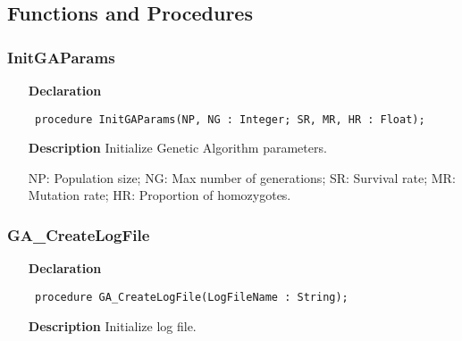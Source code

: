 \documentclass[12pt,a4paper,oneside]{report}
\newcommand{\declarationitem}[1]{\textbf{#1}}
\newcommand{\descriptiontitle}[1]{\textbf{#1}}
\newcommand{\code}[1]{\texttt{#1}}
\begin{document}
\subsection{Functions and Procedures}
\subsubsection{InitGAParams}
\label{ugenalg-InitGAParams}
\begin{itemize}\item[\declarationitem{Declaration}\hfill]
	\begin{flushleft}
		\code{
			procedure InitGAParams(NP, NG : Integer; SR, MR, HR : Float);}
		
	\end{flushleft}
	
	\par
	\item[\descriptiontitle{Description}]
	Initialize Genetic Algorithm parameters.
	
	NP: Population size; NG: Max number of generations; SR: Survival rate; MR: Mutation rate; HR: Proportion of homozygotes.
	
\end{itemize}
\subsubsection{GA{\_}CreateLogFile}
\label{ugenalg-GA_CreateLogFile}
\begin{itemize}\item[\declarationitem{Declaration}\hfill]
	\begin{flushleft}
		\code{
			procedure GA{\_}CreateLogFile(LogFileName : String);}
		
	\end{flushleft}
	
	\par
	\item[\descriptiontitle{Description}]
	Initialize log file.
	
\end{itemize}
\end{document}
